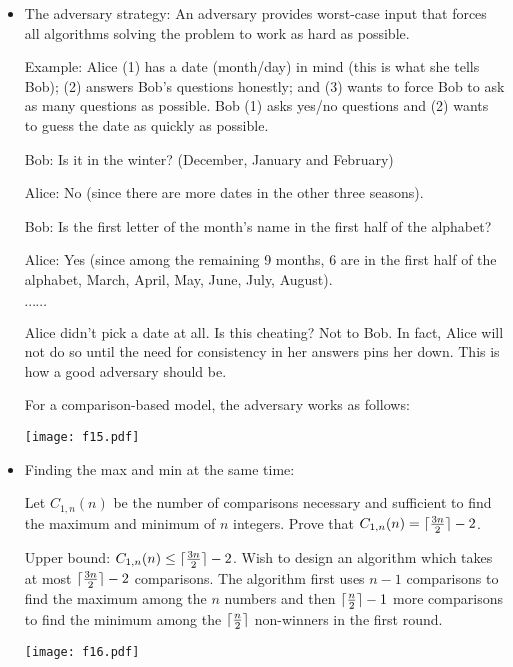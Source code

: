\documentclass{article}
\begin{document}
\begin{itemize}

\item The adversary strategy: An adversary provides worst-case
input that forces all algorithms solving the problem to work as
hard as possible.

Example: Alice (1) has a date (month/day) in mind (this is what she
tells Bob); (2) answers Bob's questions honestly; and
(3) wants to force Bob to ask as many questions as possible.
Bob (1) asks yes/no questions and
(2) wants to guess the date as quickly as possible.

Bob: Is it in the winter? (December, January and February)

Alice: No (since there are more dates in the other three seasons).

Bob: Is the first letter of the month's name in the first half of 
the alphabet?

Alice: Yes (since among the remaining 9 months, 6 are in the
first half of the alphabet, March, April, May, June, July,
August).

$\cdots\cdots$

Alice didn't pick a date at all. Is this cheating? Not to Bob.
In fact, Alice will not do so until the need for consistency
in her answers pins her down. This is how a good adversary should
be.

For a comparison-based model, the adversary works as follows:

\vskip 0.25cm
\begin{center}
\texttt{[image: f15.pdf]}
\end{center}

\item Finding the max and min at the same time:

Let $C_{1,n}(n)$ be the number of comparisons necessary and
sufficient to find the maximum and minimum of $n$ integers.
Prove that $C_{1,n}(n)=\lceil{3n\over2}\rceil-2$.

Upper bound: $C_{1,n}(n)\le\lceil{3n\over2}\rceil-2$. Wish
to design an algorithm which takes at most $\lceil{3n\over2}\rceil-2$
comparisons. The algorithm first uses $n-1$ comparisons to find the
maximum among the $n$ numbers and then $\lceil{n\over2}\rceil-1$ 
more comparisons to find the minimum among the $\lceil{n\over2}\rceil$
non-winners in the first round.

\vskip 0.25cm
\begin{center}
\texttt{[image: f16.pdf]}
\end{center}


\end{itemize}
\end{document}
